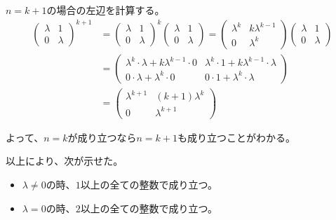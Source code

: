 \documentclass[12pt,b5paper]{ltjsarticle}
\begin{document}
\begin{enumerate}
       $n=k+1$の場合の左辺を計算する。
       \begin{align}
        \begin{pmatrix} \lambda & 1 \\ 0 & \lambda \end{pmatrix}^{\!\!k+1}
           &= \begin{pmatrix} \lambda & 1 \\ 0 & \lambda \end{pmatrix}^{\!\!k} \begin{pmatrix} \lambda & 1 \\ 0 & \lambda \end{pmatrix}
           = \begin{pmatrix} \lambda^{k} & k\lambda^{k-1} \\ 0 & \lambda^{k} \end{pmatrix} \begin{pmatrix} \lambda & 1 \\ 0 & \lambda \end{pmatrix}\\
           &= \begin{pmatrix} \lambda^{k}\cdot\lambda+k\lambda^{k-1}\cdot0 & \lambda^{k}\cdot1+k\lambda^{k-1}\cdot\lambda \\ 0\cdot\lambda+\lambda^{k}\cdot0 & 0\cdot1+\lambda^{k}\cdot\lambda \end{pmatrix}\\
           &= \begin{pmatrix} \lambda^{k+1} & (k+1)\lambda^{k} \\ 0 & \lambda^{k+1} \end{pmatrix}
       \end{align}

       よって、$n=k$が成り立つなら$n=k+1$も成り立つことがわかる。

       \dotfill

       以上により、次が示せた。
       
       \begin{itemize}
        \item
             $\lambda\ne 0$の時、$1$以上の全ての整数で成り立つ。
        \item
             $\lambda= 0$の時、$2$以上の全ての整数で成り立つ。
       \end{itemize}

       \hrulefill

\end{enumerate}

\hrulefill
\end{document}
